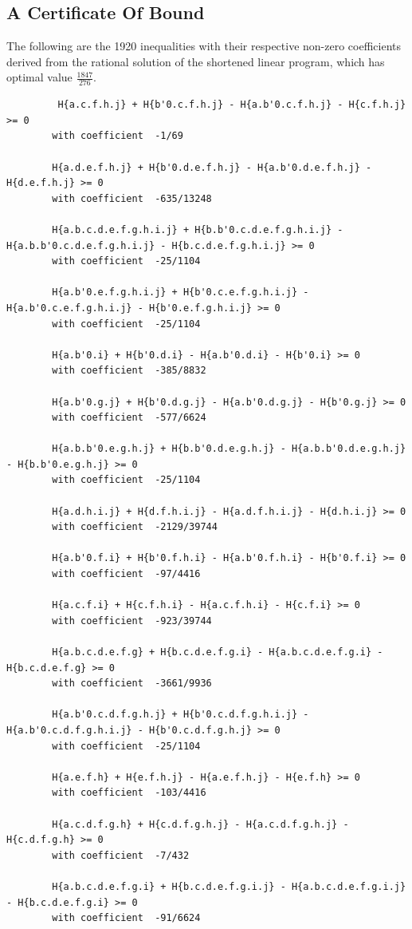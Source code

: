 \documentclass[11pt, a4paper]{kybernetika}
\begin{document}
	\subsection{A Certificate Of  Bound}
	The following are the 1920 inequalities with their respective non-zero coefficients derived from the rational solution of the shortened linear program, which has optimal value $\frac{1847}{276}$.
	\tiny
	\begin{verbatim}
		 H{a.c.f.h.j} + H{b'0.c.f.h.j} - H{a.b'0.c.f.h.j} - H{c.f.h.j} >= 0
		with coefficient  -1/69
		
		H{a.d.e.f.h.j} + H{b'0.d.e.f.h.j} - H{a.b'0.d.e.f.h.j} - H{d.e.f.h.j} >= 0
		with coefficient  -635/13248
		
		H{a.b.c.d.e.f.g.h.i.j} + H{b.b'0.c.d.e.f.g.h.i.j} - H{a.b.b'0.c.d.e.f.g.h.i.j} - H{b.c.d.e.f.g.h.i.j} >= 0
		with coefficient  -25/1104
		
		H{a.b'0.e.f.g.h.i.j} + H{b'0.c.e.f.g.h.i.j} - H{a.b'0.c.e.f.g.h.i.j} - H{b'0.e.f.g.h.i.j} >= 0
		with coefficient  -25/1104
		
		H{a.b'0.i} + H{b'0.d.i} - H{a.b'0.d.i} - H{b'0.i} >= 0
		with coefficient  -385/8832
		
		H{a.b'0.g.j} + H{b'0.d.g.j} - H{a.b'0.d.g.j} - H{b'0.g.j} >= 0
		with coefficient  -577/6624
		
		H{a.b.b'0.e.g.h.j} + H{b.b'0.d.e.g.h.j} - H{a.b.b'0.d.e.g.h.j} - H{b.b'0.e.g.h.j} >= 0
		with coefficient  -25/1104
		
		H{a.d.h.i.j} + H{d.f.h.i.j} - H{a.d.f.h.i.j} - H{d.h.i.j} >= 0
		with coefficient  -2129/39744
		
		H{a.b'0.f.i} + H{b'0.f.h.i} - H{a.b'0.f.h.i} - H{b'0.f.i} >= 0
		with coefficient  -97/4416
		
		H{a.c.f.i} + H{c.f.h.i} - H{a.c.f.h.i} - H{c.f.i} >= 0
		with coefficient  -923/39744
		
		H{a.b.c.d.e.f.g} + H{b.c.d.e.f.g.i} - H{a.b.c.d.e.f.g.i} - H{b.c.d.e.f.g} >= 0
		with coefficient  -3661/9936
		
		H{a.b'0.c.d.f.g.h.j} + H{b'0.c.d.f.g.h.i.j} - H{a.b'0.c.d.f.g.h.i.j} - H{b'0.c.d.f.g.h.j} >= 0
		with coefficient  -25/1104
		
		H{a.e.f.h} + H{e.f.h.j} - H{a.e.f.h.j} - H{e.f.h} >= 0
		with coefficient  -103/4416
		
		H{a.c.d.f.g.h} + H{c.d.f.g.h.j} - H{a.c.d.f.g.h.j} - H{c.d.f.g.h} >= 0
		with coefficient  -7/432
		
		H{a.b.c.d.e.f.g.i} + H{b.c.d.e.f.g.i.j} - H{a.b.c.d.e.f.g.i.j} - H{b.c.d.e.f.g.i} >= 0
		with coefficient  -91/6624
		

\end{verbatim}
\end{document}
